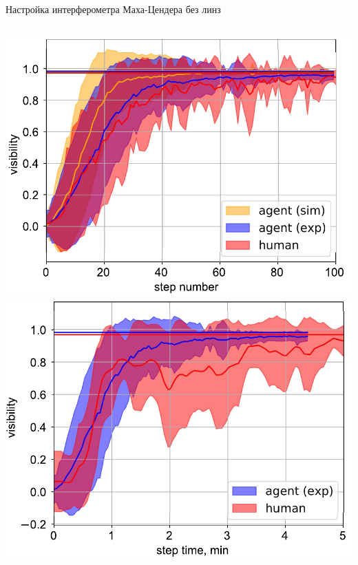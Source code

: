 \begin{frame}[allowframebreaks]{Настройка интерферометра Маха-Цендера без линз}
\begin{columns}
\centering
\includegraphics[width=1\linewidth]{images/eval1_visib_step.pdf}
\includegraphics[width=1\linewidth]{images/eval1_visib_time.pdf}
\end{columns}


\end{frame}
